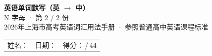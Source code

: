 \documentclass[10pt,a4paper]{article}
\begin{document}
\pagestyle{plain}

\begin{center}
{\LARGE\bfseries 英语单词默写（英 $\to$ 中）}\\[0.22em]
{\large N 字母 · 第 2 / 2 份}\\[0.18em]
{\small 2026年上海市高考英语词汇用法手册 · 参照普通高中英语课程标准}
\end{center}

\vspace{0.25em}
\noindent\begin{tabular}{@{}p{}@{}p{}@{}p{}@{}}
姓名：\underline{\hspace{2.0cm}} & 日期：\underline{\hspace{2.0cm}} & 得分：\underline{\hspace{1.3cm}}\,/\,44 \\
\end{tabular}

\vspace{0.3em}

\vspace{0.08em}
\end{document}
